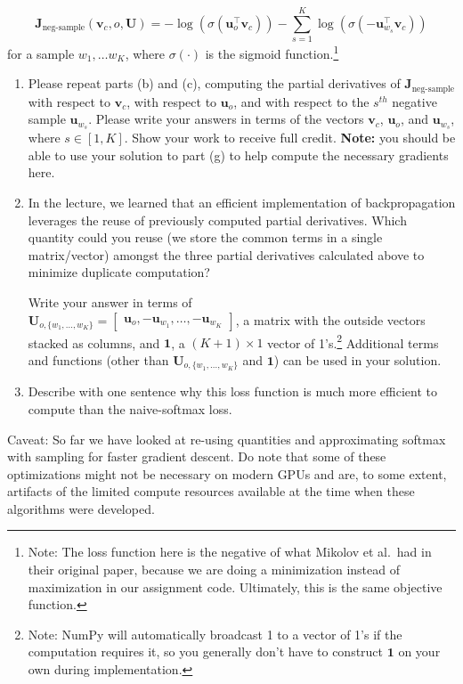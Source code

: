 \documentclass{article}
\begin{document}
\begin{enumerate}[label=(\alph*)]
\begin{equation}
\bm J_{\text{neg-sample}}(\bm v_c, o, \bm U) = -\log(\sigma(\bm u_o^\top \bm v_c)) - \sum_{s=1}^K \log(\sigma(-\bm u_{w_s}^\top \bm v_c))
\end{equation}
for a sample $w_1, \ldots w_K$, where $\sigma(\cdot)$ is the sigmoid function.\footnote{Note: The loss function here is the negative of what Mikolov et al.\ had in their original paper, because we are doing a minimization instead of maximization in our assignment code. Ultimately, this is the same objective function.}

\begin{enumerate}[label=(\roman*)]
\item Please repeat parts (b) and (c), computing the partial derivatives of $\bm J_{\text{neg-sample}}$ with respect to $\bm v_c$, with respect to $\bm u_o$, and with respect to the $s^{th}$ negative sample $\bm u_{w_s}$. Please write your answers in terms of the vectors $\bm v_c$, $\bm u_o$, and $\bm u_{w_s}$, where $s \in [1, K]$. Show your work to receive full credit. \textbf{Note:} you should be able to use your solution to part (g) to help compute the necessary gradients here.

\item In the lecture, we learned that an efficient implementation of backpropagation leverages the reuse of previously computed partial derivatives. Which quantity could you reuse (we store the common terms in a single matrix/vector) amongst the three partial derivatives calculated above to minimize duplicate computation? 

Write your answer in terms of \\ $\bm{U}_{o, \{w_1, \dots, w_K\}} = \begin{bmatrix} \bm{u}_o, -\bm{u}_{w_1}, \dots, -\bm{u}_{w_K} \end{bmatrix}$, a matrix with the outside vectors stacked as columns, and $\bm{1}$, a $(K + 1) \times 1$ vector of 1's.\footnote{Note: NumPy will automatically broadcast 1 to a vector of 1's if the computation requires it, so you generally don't have to construct $\bm{1}$ on your own during implementation.}
Additional terms and functions (other than $\bm{U}_{o, \{w_1, \dots, w_K\}}$ and $\bm{1}$) can be used in your solution.
\item Describe with one sentence why this loss function is much more efficient to compute than the naive-softmax loss.
\end{enumerate}

Caveat: So far we have looked at re-using quantities and approximating softmax with sampling for faster gradient descent. Do note that some of these optimizations might not be necessary on modern GPUs and are, to some extent, artifacts of the limited compute resources available at the time when these algorithms were developed.


\end{enumerate}
\end{document}
